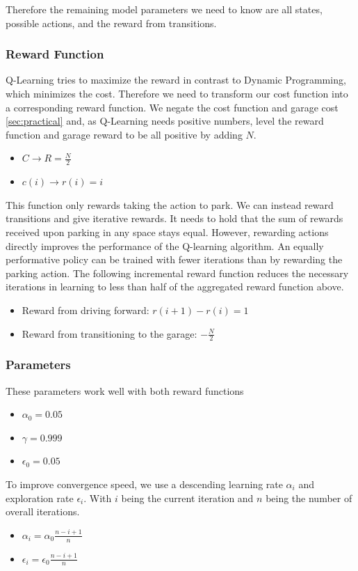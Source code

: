 Therefore the remaining model parameters we need to know are all states, possible actions, and the reward from transitions.

\subsubsection{Reward Function}
Q-Learning tries to maximize the reward in contrast to Dynamic Programming, which minimizes the cost. Therefore we need to transform our cost function into a corresponding reward function. 
We negate the cost function and garage cost \ref{sec:practical} and, as Q-Learning needs positive numbers, level the reward function and garage reward to be all positive by adding $N$.

\begin{itemize}
	\item $C \rightarrow R = \frac{N}{2}$
	\item $c(i) \rightarrow r(i) = i$
\end{itemize}

This function only rewards taking the action to park. We can instead reward transitions and give iterative rewards. It needs to hold that the sum of rewards received upon parking in any space stays equal. However, rewarding actions directly improves the performance of the Q-learning algorithm. An equally performative policy can be trained with fewer iterations than by rewarding the parking action. The following incremental reward function reduces the necessary iterations in learning to less than half of the aggregated reward function above.

\begin{itemize}
	\item Reward from driving forward: $r(i+1) - r(i) = 1$
	\item Reward from transitioning to the garage: $-\frac{N}{2}$
\end{itemize}

\subsubsection{Parameters}
These parameters work well with both reward functions
\begin{itemize}
	\item $\alpha_0 = 0.05$
	\item $\gamma = 0.999$
	\item $\epsilon_0 = 0.05$ 
\end{itemize}
To improve convergence speed, we use a descending learning rate $\alpha_i$ and exploration rate $\epsilon_i$. With $i$ being the current iteration and $n$ being the number of overall iterations.
\begin{itemize}
	\item $\alpha_i = \alpha_0 \frac{n - i + 1}{n}$
	\item $\epsilon_i = \epsilon_0 \frac{n - i + 1}{n}$
\end{itemize}
